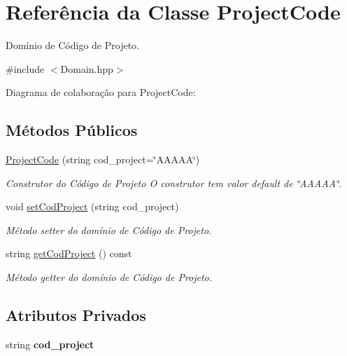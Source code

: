 \hypertarget{classProjectCode}{}\section{Referência da Classe Project\+Code}
\label{classProjectCode}


Domínio de Código de Projeto.  




{\ttfamily \#include $<$Domain.\+hpp$>$}



Diagrama de colaboração para Project\+Code\+:
\subsection*{Métodos Públicos}
\begin{DoxyCompactItemize}
\item 
\hyperlink{classProjectCode_adb4266f1d34ad0737a116db0df9b8dd2}{Project\+Code} (string cod\+\_\+project=\char`\"{}A\+A\+A\+AA\char`\"{})\hypertarget{classProjectCode_adb4266f1d34ad0737a116db0df9b8dd2}{}\label{classProjectCode_adb4266f1d34ad0737a116db0df9b8dd2}

\begin{DoxyCompactList}\small\item\em Construtor do Código de Projeto O construtor tem valor default de \char`\"{}\+A\+A\+A\+A\+A\char`\"{}. \end{DoxyCompactList}\item 
void \hyperlink{classProjectCode_a053de7ba0bd5dbdaa8a78043c4e2c6ec}{set\+Cod\+Project} (string cod\+\_\+project)
\begin{DoxyCompactList}\small\item\em Método setter do domínio de Código de Projeto. \end{DoxyCompactList}\item 
string \hyperlink{classProjectCode_ae57151a35f220af7c3b9bf6ea5acf4b9}{get\+Cod\+Project} () const 
\begin{DoxyCompactList}\small\item\em Método getter do domínio de Código de Projeto. \end{DoxyCompactList}\end{DoxyCompactItemize}
\subsection*{Atributos Privados}
\begin{DoxyCompactItemize}
\item 
string {\bfseries cod\+\_\+project}\hypertarget{classProjectCode_ade4bb7f9d81e005c106d68cc8e2017d9}{}\label{classProjectCode_ade4bb7f9d81e005c106d68cc8e2017d9}

\end{DoxyCompactItemize}


